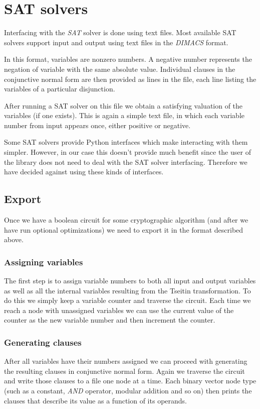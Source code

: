 \section{SAT solvers}

Interfacing with the \emph{SAT} solver is done using 	text files.
Most available SAT solvers support input and output using text files in the \emph{DIMACS} format.

In this format, variables are nonzero numbers.
A negative number represents the negation of variable with the same absolute value.
Individual clauses in the conjunctive normal form are then provided as lines in the file, each line listing the variables of a particular disjunction.

After running a SAT solver on this file we obtain a satisfying valuation of the variables (if one exists).
This is again a simple text file, in which each variable number from input appears once, either positive or negative.

Some SAT solvers provide Python interfaces which make interacting with them simpler.
However, in our case this doesn't provide much benefit since the user of the library does not need to deal with the SAT solver interfacing.
Therefore we have decided against using these kinds of interfaces.

\subsection{Export}

Once we have a boolean circuit for some cryptographic algorithm (and after we have run optional optimizations) we need to export it in the format described above.

\subsubsection{Assigning variables}
The first step is to assign variable numbers to both all input and output variables as well as all the internal variables resulting from the Tseitin transformation.
To do this we simply keep a variable counter and traverse the circuit.
Each time we reach a node with unassigned variables we can use the current value of the counter as the new variable number and then increment the counter.

\subsubsection{Generating clauses}
After all variables have their numbers assigned we can proceed with generating the resulting clauses in conjunctive normal form.
Again we traverse the circuit and write those clauses to a file one node at a time.
Each binary vector node type (such as a constant, \emph{AND} operator, modular addition and so on) then prints the clauses that describe its value as a function of its operands.

